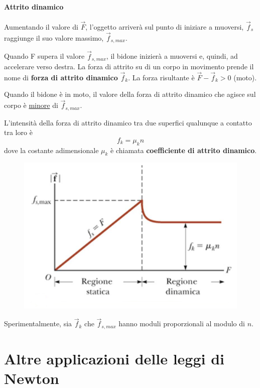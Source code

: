\documentclass[a4paper,11pt,oneside]{book}
\begin{document}
\paragraph{Attrito dinamico}
Aumentando il valore di $\vec{F}$, l'oggetto arriverà sul punto di iniziare a muoversi, $\vec{f}_s$ raggiunge il suo valore massimo, $\vec{f}_{s,max}$.

Quando F supera il valore $\vec{f}_{s,max}$, il bidone inizierà a muoversi e, quindi, ad accelerare verso destra. La forza di attrito su di un corpo in movimento prende il nome di \textbf{forza di attrito dinamico} $\vec{f}_k$.
La forza risultante è $\vec{F} - \vec{f}_k > 0$ (moto).

Quando il bidone è in moto, il valore della forza di attrito dinamico che agisce sul corpo è \underline{minore} di $\vec{f}_{s,max}$. 

L’intensità della forza di attrito dinamico tra due superfici qualunque a contatto tra loro è
\begin{equation*}
    f_k = \mu_k n
\end{equation*}
dove la costante adimensionale $\mu_k$ è chiamata \textbf{coefficiente di attrito dinamico}.

\begin{figure}[h]
    \centering
    \includegraphics[scale=0.3]{forze_attrito_grafico}
\end{figure}
\noindent Sperimentalmente, sia $\vec{f}_k$ che $\vec{f}_{s,max}$ hanno moduli proporzionali al modulo di $n$.

\newpage
\section{Altre applicazioni delle leggi di Newton}
\end{document}
